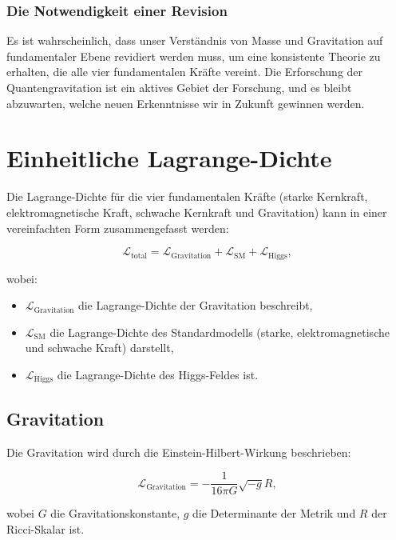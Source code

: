 \documentclass{article}
\begin{document}
\subsubsection{Die Notwendigkeit einer Revision}

Es ist wahrscheinlich, dass unser Verständnis von Masse und Gravitation auf fundamentaler Ebene revidiert werden muss, um eine konsistente Theorie zu erhalten, die alle vier fundamentalen Kräfte vereint. Die Erforschung der Quantengravitation ist ein aktives Gebiet der Forschung, und es bleibt abzuwarten, welche neuen Erkenntnisse wir in Zukunft gewinnen werden.

	\section{Einheitliche Lagrange-Dichte}

Die Lagrange-Dichte für die vier fundamentalen Kräfte (starke Kernkraft, elektromagnetische Kraft, schwache Kernkraft und Gravitation) kann in einer vereinfachten Form zusammengefasst werden:

\begin{equation}
	\mathcal{L}_\text{total} = \mathcal{L}_\text{Gravitation} + \mathcal{L}_\text{SM} + \mathcal{L}_\text{Higgs},
\end{equation}

wobei:
\begin{itemize}
	\item $\mathcal{L}_\text{Gravitation}$ die Lagrange-Dichte der Gravitation beschreibt,
	\item $\mathcal{L}_\text{SM}$ die Lagrange-Dichte des Standardmodells (starke, elektromagnetische und schwache Kraft) darstellt,
	\item $\mathcal{L}_\text{Higgs}$ die Lagrange-Dichte des Higgs-Feldes ist.
\end{itemize}

\subsection{Gravitation}
Die Gravitation wird durch die Einstein-Hilbert-Wirkung beschrieben:

\begin{equation}
	\mathcal{L}_\text{Gravitation} = -\frac{1}{16\pi G} \sqrt{-g} R,
\end{equation}

wobei $G$ die Gravitationskonstante, $g$ die Determinante der Metrik und $R$ der Ricci-Skalar ist.
\end{document}
